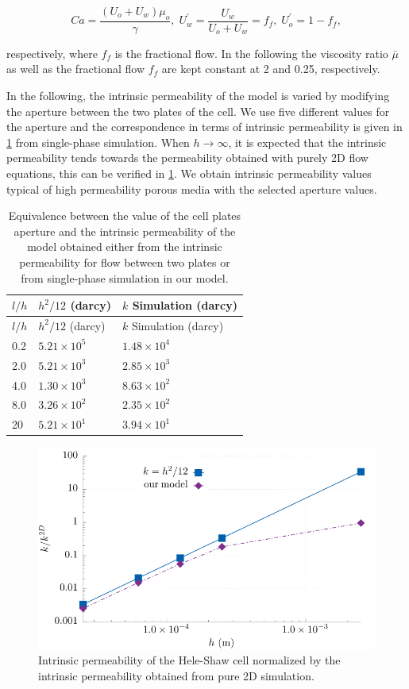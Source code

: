 \documentclass[]{article}
\begin{document}
\[
Ca=\frac{(U_{o}+U_{w})\mu_{o}}{\gamma},\;U_{w}^{'}=\frac{U_{w}}{U_{o}+U_{w}}=f_{f},\;U_{o}^{'}=1-f_{f},
\]

respectively, where \(f_{f}\) is the fractional flow. In the following
the viscosity ratio \(\bar{\mu}\) as well as the fractional flow
\(f_{f}\) are kept constant at 2 and 0.25, respectively.

In the following, the intrinsic permeability of the model is varied by
modifying the aperture between the two plates of the cell. We use five
different values for the aperture and the correspondence in terms of
intrinsic permeability is given in \cref{tbl:permeability} from
single-phase simulation. When \(h\rightarrow\infty\), it is expected
that the intrinsic permeability tends towards the permeability obtained
with purely 2D flow equations, this can be verified in
\cref{fig:permeability}. We obtain intrinsic permeability values typical
of high permeability porous media with the selected aperture values.

\begin{longtable}[]{@{}lll@{}}
\caption{Equivalence between the value of the cell plates aperture and
the intrinsic permeability of the model obtained either from the
intrinsic permeability for flow between two plates or from single-phase
simulation in our model. \label{tbl:permeability}}\tabularnewline
\toprule
\(l/h\) & \(h^2/12\) (darcy) & \(k\) Simulation (darcy)\tabularnewline
\midrule
\endfirsthead
\toprule
\(l/h\) & \(h^2/12\) (darcy) & \(k\) Simulation (darcy)\tabularnewline
\midrule
\endhead
0.2 & \(5.21 \times 10^{5}\) & \(1.48 \times 10^{4}\)\tabularnewline
2.0 & \(5.21 \times 10^{3}\) & \(2.85 \times 10^{3}\)\tabularnewline
4.0 & \(1.30 \times 10^{3}\) & \(8.63 \times 10^{2}\)\tabularnewline
8.0 & \(3.26 \times 10^{2}\) & \(2.35 \times 10^{2}\)\tabularnewline
20 & \(5.21 \times 10^{1}\) & \(3.94 \times 10^{1}\)\tabularnewline
\bottomrule
\end{longtable}

\begin{figure}
\hypertarget{fig:permeability}{%
\centering
\includegraphics{figures/pdf/permeability.pdf}
\caption{Intrinsic permeability of the Hele-Shaw cell normalized by the
intrinsic permeability obtained from pure 2D
simulation.}\label{fig:permeability}
}
\end{figure}
\end{document}
